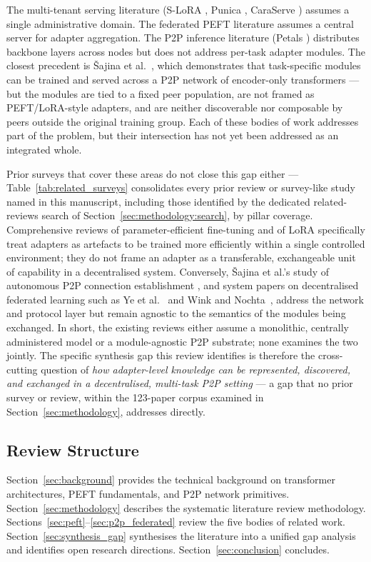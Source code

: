 The multi-tenant serving literature (S-LoRA \cite{Sheng2024}, Punica \cite{Chen2023Punica}, 
CaraServe \cite{Li2024CaraServe}) assumes a single administrative domain. 
The federated PEFT literature assumes a central server for adapter aggregation. 
The P2P inference literature (Petals \cite{Borzunov2023}) distributes backbone 
layers across nodes but does not address per-task adapter modules. The closest precedent is 
{\v{S}}ajina et al.~\cite{Sajina2024}, which demonstrates that task-specific modules can be trained and served 
across a P2P network of encoder-only transformers — but the modules are tied to a fixed peer 
population, are not framed as PEFT/LoRA-style adapters, and are neither discoverable nor composable 
by peers outside the original training group. Each of these bodies of work addresses part
of the problem, but their intersection has not yet been addressed as an integrated whole.

Prior surveys that cover these areas do not close this gap either ---
Table~\ref{tab:related_surveys} consolidates every prior review or
survey-like study named in this manuscript, including those identified by
the dedicated related-reviews search of Section~\ref{sec:methodology:search},
by pillar coverage. Comprehensive reviews of
parameter-efficient fine-tuning \cite{Han2024,WangAIReview2024} and of LoRA specifically
\cite{MaoLoraSurvey2024} treat adapters as artefacts to be trained more efficiently within a
single controlled environment; they do not frame an adapter as a transferable, exchangeable
unit of capability in a decentralised system. Conversely, {\v S}ajina et al.'s study of
autonomous P2P connection establishment \cite{SajinaP2PConnection2024}, and system papers on
decentralised federated learning such as Ye et al.~\cite{YeDecentralizedFL2022} and Wink and
Nochta~\cite{WinkP2PFL2021}, address the network and protocol
layer but remain agnostic to the semantics of the modules being exchanged. In short, the
existing reviews either assume a monolithic, centrally administered model or a module-agnostic
P2P substrate; none examines the two jointly. The specific synthesis gap this review identifies is
therefore the cross-cutting question of \emph{how adapter-level knowledge can be represented,
discovered, and exchanged in a decentralised, multi-task P2P setting} --- a gap that no prior
survey or review, within the 123-paper corpus examined in
Section~\ref{sec:methodology}, addresses directly.

\subsection{Review Structure}
\label{sec:introduction:structure}

Section~\ref{sec:background} provides the technical background on transformer
architectures, PEFT fundamentals, and P2P network primitives. Section~\ref{sec:methodology}
describes the systematic literature review methodology. Sections~\ref{sec:peft}--\ref{sec:p2p_federated}
review the five bodies of related work. Section~\ref{sec:synthesis_gap} synthesises the
literature into a unified gap analysis and identifies open research directions.
Section~\ref{sec:conclusion} concludes.
